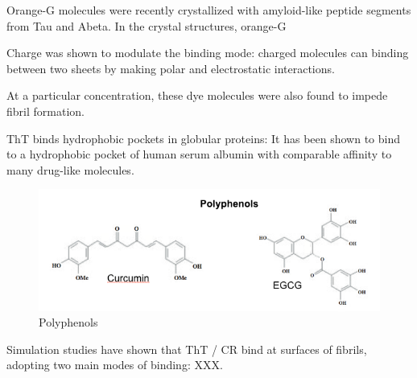 Orange-G molecules were recently crystallized with amyloid-like peptide segments from Tau and Abeta.  In the crystal structures, orange-G 

Charge was shown to modulate the binding mode: charged molecules can binding between two sheets by making polar and electrostatic interactions.

At a particular concentration, these dye molecules were also found to impede fibril formation.\cite{XXX}

ThT binds hydrophobic pockets in globular proteins: It has been shown to bind to a hydrophobic pocket of human serum albumin with comparable affinity to many drug-like molecules.\cite{Groenning:2007p3436,Groenning:2007eo}




\begin{figure}
\centering
\includegraphics[width=6in]{figures/introduction/polyphenols.png}
\caption[Small molecule binders]{Polyphenols}
\label{fig:polyphenols}
\end{figure}

Simulation studies have shown that ThT / CR bind at surfaces of fibrils, adopting two main modes of binding: XXX.\cite{XXX I'm thinking of the Chun Wu study from 2007, were there more?}

